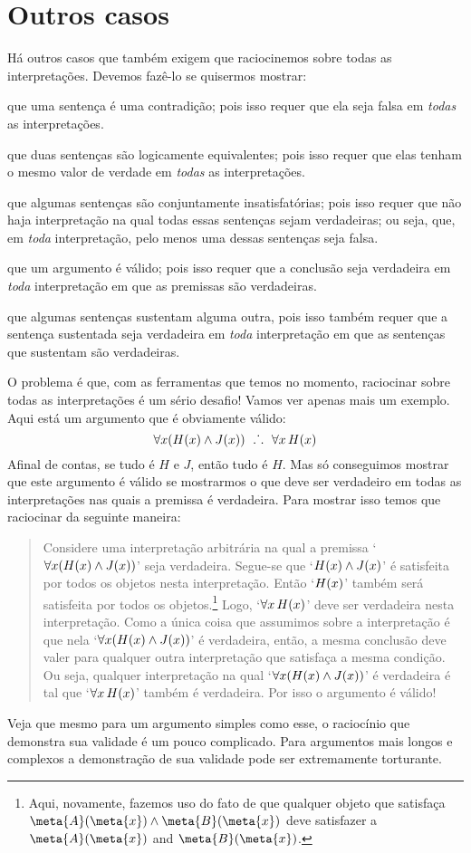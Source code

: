 \section{Outros casos}
Há outros casos que também exigem que raciocinemos sobre todas as interpretações. Devemos fazê-lo se quisermos mostrar:
	\begin{ebullet}
	\item que uma sentença é uma contradição; pois isso requer que ela seja falsa em \emph{todas} as interpretações.
	\item que duas sentenças são logicamente equivalentes; pois isso requer que elas tenham o mesmo valor de verdade em \emph{todas} as interpretações.
	\item que algumas sentenças são conjuntamente insatisfatórias; pois isso requer que não haja interpretação na qual todas essas sentenças sejam verdadeiras; ou seja, que, em \emph{toda} interpretação, pelo menos uma dessas sentenças seja falsa.
	\item que um argumento é válido; pois isso requer que a conclusão seja verdadeira em \emph{toda} interpretação em que as premissas são verdadeiras.
	\item que algumas sentenças sustentam alguma outra, pois isso também requer que a sentença sustentada seja verdadeira em \emph{toda} interpretação em que as sentenças que sustentam são verdadeiras.
	\end{ebullet}
O problema é que, com as ferramentas que temos no momento, raciocinar sobre todas as interpretações é um sério desafio! Vamos ver apenas mais um exemplo. Aqui está um argumento que é obviamente válido:
	$$\forall x(\atom{H}{x} \eand \atom{J}{x}) \ \therefore \ \forall x\, \atom{H}{x}$$
Afinal de contas, se tudo é $H$ e $J$, então tudo é $H$.
Mas só conseguimos mostrar que este argumento é válido se mostrarmos o que deve ser verdadeiro em todas as interpretações nas quais a premissa é verdadeira.
Para mostrar isso temos que raciocinar da seguinte maneira:
	\begin{quote}
		Considere uma interpretação arbitrária na qual a premissa `$\forall x(\mathord{H}(x) \wedge \mathord{J}(x))$' seja verdadeira.
		Segue-se que `$\mathord{H}(x) \wedge \mathord{J}(x)$' é satisfeita por todos os objetos nesta interpretação.
		Então `$\mathord{H}(x)$' também será satisfeita por todos os objetos.\footnote{
			Aqui, novamente, fazemos uso do fato de que qualquer objeto que satisfaça $\meta{A}(\meta{x}) \land \meta{B}(\meta{x})$ deve satisfazer a $\meta{A}(\meta{x})$ and $\meta{B}(\meta{x})$.
		}
		Logo, `$\forall x\, \mathord{H}(x)$' deve ser verdadeira nesta interpretação.
		Como a única coisa que assumimos sobre a interpretação é que nela `$\forall x(\mathord{H}(x) \wedge \mathord{J}(x))$' é verdadeira, então, a mesma conclusão deve valer para qualquer outra interpretação que satisfaça a mesma condição.
		Ou seja, qualquer interpretação na qual `$\forall x(\mathord{H}(x) \wedge \mathord{J}(x))$' é verdadeira é tal que `$\forall x\, \mathord{H}(x)$' também é verdadeira.
		Por isso o argumento é válido!
\end{quote}
Veja que mesmo para um argumento simples como esse, o raciocínio que demonstra sua validade é um pouco complicado. Para argumentos mais longos e complexos a demonstração de sua validade pode ser extremamente torturante.


